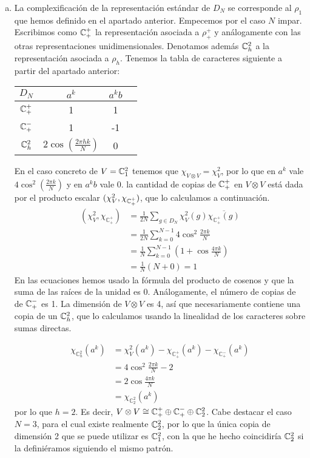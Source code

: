 \documentclass[twoside]{article}
\begin{document}
\begin{solucion}
\begin{enumerate}[(a)]
\item La complexificación de la representación estándar de $D_N$ se corresponde al $\rho_1$ que hemos definido en el apartado anterior. Empecemos por el caso $N$ impar. Escribimos como $\mathbb{C}_+^+$ la representación asociada a $\rho_+^+$ y análogamente con las otras representaciones unidimensionales. Denotamos además $\mathbb{C}^2_h$ a la representación asociada a $\rho_h$. Tenemos la tabla de caracteres siguiente a partir del apartado anterior:

\begin{tabular}{|c|c|c|c|}
\hline
$D_N$ &       $a^k$ & $a^kb$ \\
\hline
$\mathbb{C}_+^+$   &    1   &    1 \\
\hline
$\mathbb{C}_+^-$   &    1   &    -1\\
\hline
$\mathbb{C}^2_h$   &  $2\cos(\frac{2\pi h k}{N})$ & 0\\
\hline
\end{tabular}

En el caso concreto de $V=\mathbb{C}^2_1$ tenemos que $\chi_{V\otimes V}=\chi_V^2$, por lo que en $a^k$ vale $4\cos^2(\frac{2\pi k}{N})$ y en $a^kb$ vale 0. la cantidad de copias de $\mathbb{C}_+^+$ en $V\otimes V$ está dada por el producto escalar $(\chi_V^2,\chi_{\mathbb{C}_+^+})$, que lo calculamos a continuación.
\begin{align*}
(\chi_{V}^2, \chi_{\mathbb{C}_+^+})
&= \frac{1}{2N} \sum_{g \in D_N} \chi_{V}^2(g)\overline{\chi_{\mathbb{C}_+^+}(g)} \\
&= \frac{1}{2N} \sum_{k=0}^{N-1} 4 \cos^2 \frac{2\pi k}{N} \\
&= \frac{1}{N} \sum_{k=0}^{N-1} \left(1 + \cos \frac{4\pi k}{N}\right)\\
&= \frac{1}{N} (N + 0) = 1
\end{align*}
En las ecuaciones hemos usado la fórmula del producto de cosenos y que la suma de las raíces de la unidad es 0. Análogamente, el número de copias de de $\mathbb{C}_+^-$ es 1. La dimensión de $V\otimes V$ es 4, así que necesariamente contiene una copia de un $\mathbb{C}^2_h$, que lo calculamos usando la linealidad de los caracteres sobre sumas directas.

\begin{align*}
\chi_{\mathbb{C}^2_h}(a^k)
&= \chi_{V}^2(a^k) - \chi_{\mathbb{C}_+^+}(a^k) -
\chi_{\mathbb{C}_+^-}(a^k) \\
&= 4 \cos^2 \frac{2\pi k}{N} - 2 \\
&= 2 \cos \frac{4\pi k}{N} \\
&= \chi_{\mathbb{C}^2_2}(a^k)
\end{align*}
por lo que $h=2$. Es decir, $V\otimes V\cong \mathbb{C}_+^+\oplus \mathbb{C}_+^-\oplus \mathbb{C}^2_2$. Cabe destacar el caso $N=3$, para el cual existe realmente $\mathbb{C}_2^2$, por lo que la única copia de dimensión 2 que se puede utilizar es $\mathbb{C}^2_1$, con la que he hecho coincidiría $\mathbb{C}_2^2$ si la definiéramos siguiendo el mismo patrón.




\end{enumerate}
\end{solucion}
\end{document}

